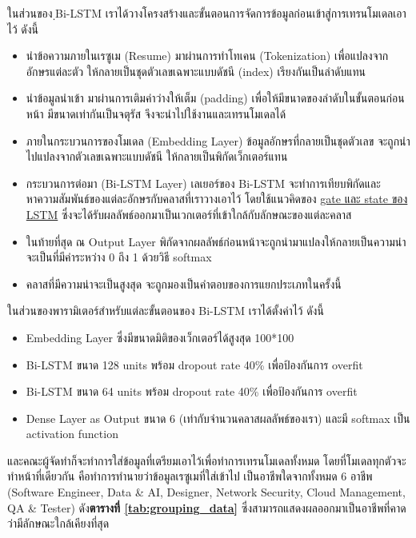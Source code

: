 ในส่วนของ ฺBi-LSTM เราได้วางโครงสร้างและขั้นตอนการจัดการข้อมูลก่อนเข้าสู่การเทรนโมเดลเอาไว้ ดังนี้
\begin{itemize}
    \item นำข้อความภายในเรซูเม (Resume) มาผ่านการทำโทเคน (Tokenization) เพื่อแปลงจากอักษรแต่ละตัว ให้กลายเป็นชุดตัวเลขเฉพาะแบบดัชนี (index) เรียงกันเป็นลำดับแทน
    \item นำข้อมูลนำเข้า มาผ่านการเติมค่าว่างให้เต็ม (padding) เพื่อให้มีขนาดของลำดับในขั้นตอนก่อนหน้า มีขนาดเท่ากันเป็นจตุรัส จึงจะนำไปใช้งานและเทรนโมเดลได้
    \item ภายในกระบวนการของโมเดล (Embedding Layer) ข้อมูลอักษรที่กลายเป็นชุดตัวเลข จะถูกนำไปแปลงจากตัวเลขเฉพาะแบบดัชนี ให้กลายเป็นพิกัดเว็กเตอร์แทน
    \item กระบวนการต่อมา (Bi-LSTM Layer) เลเยอร์ของ Bi-LSTM จะทำการเทียบพิกัดและหาความสัมพันธ์ของแต่ละอักษรกับคลาสที่เราวางเอาไว้ โดยใช้แนวคิดของ \hyperref[subsec:lstm]{gate และ state ของ LSTM} ซึ่งจะได้รับผลลัพธ์ออกมาเป็นเวกเตอร์ที่เข้าใกล้กับลักษณะของแต่ละคลาส
    \item ในท้ายที่สุด ณ Output Layer พิกัดจากผลลัพธ์ก่อนหน้าจะถูกนำมาแปลงให้กลายเป็นความน่าจะเป็นที่มีค่าระหว่าง 0 ถึง 1 ด้วยวิธี softmax
    \item คลาสที่มีความน่าจะเป็นสูงสุด จะถูกมองเป็นคำตอบของการแยกประเภทในครั้งนี้
\end{itemize}
ในส่วนของพารามิเตอร์สำหรับแต่ละขั้นตอนของ Bi-LSTM เราได้ตั้งค่าไว้ ดังนี้
\begin{itemize}
    \item Embedding Layer ซึ่งมีขนาดมิติของเว็กเตอร์ได้สูงสุด 100*100
    \item Bi-LSTM ขนาด 128 units พร้อม dropout rate 40\% เพื่อป้องกันการ overfit
    \item Bi-LSTM ขนาด 64 units พร้อม dropout rate 40\% เพื่อป้องกันการ overfit
    \item Dense Layer as Output ขนาด 6 (เท่ากับจำนวนคลาสผลลัพธ์ของเรา) และมี softmax เป็น activation function
\end{itemize}


\par และคณะผู้จัดทำก็จะทำการใส่ข้อมูลที่เตรียมเอาไว้เพื่อทำการเทรนโมเดลทั้งหมด โดยที่โมเดลทุกตัวจะทำหน้าที่เดียวกัน คือทำการทำนายว่าข้อมูลเรซูเมที่ใส่เข้าไป
เป็นอาชีพใดจากทั้งหมด 6 อาชีพ (Software Engineer, Data \& AI, Designer, Network Security, Cloud Management, QA \& Tester)
ดัง\textbf{ตารางที่ \ref{tab:grouping_data}} ซึ่งสามารถแสดงผลออกมาเป็นอาชีพที่คาดว่ามีลักษณะใกล้เคียงที่สุด

